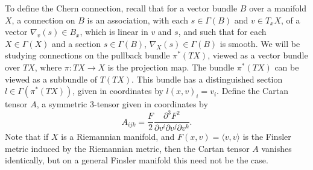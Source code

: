 To define the Chern connection, recall that for a vector bundle $B$ over a manifold $X$, a connection on $B$ is an association, with each $s \in \Gamma(B)$ and $v \in T_x X$, of a vector $\nabla_v(s) \in B_x$, which is linear in $v$ and $s$, and such that for each $X \in \Gamma(X)$ and a section $s \in \Gamma(B)$, $\nabla_X(s) \in \Gamma(B)$ is smooth. We will be studying connections on the pullback bundle $\pi^*(TX)$, viewed as a vector bundle over $TX$, where $\pi: TX \to X$ is the projection map. The bundle $\pi^*(TX)$ can be viewed as a subbundle of $T(TX)$. This bundle has a distinguished section $l \in \Gamma(\pi^*(TX))$, given in coordinates by $l(x,v)_i = v_i$. Define the Cartan tensor $A$, a symmetric 3-tensor given in coordinates by
%
\begin{equation}
  A_{ijk} = \frac{F}{2} \frac{\partial^3 F^2}{\partial v^i \partial v^j \partial v^k}. 
\end{equation}
%
Note that if $X$ is a Riemannian manifold, and $F(x,v) = \langle v,v \rangle$ is the Finsler metric induced by the Riemannian metric, then the Cartan tensor $A$ vanishes identically, but on a general Finsler manifold this need not be the case.

